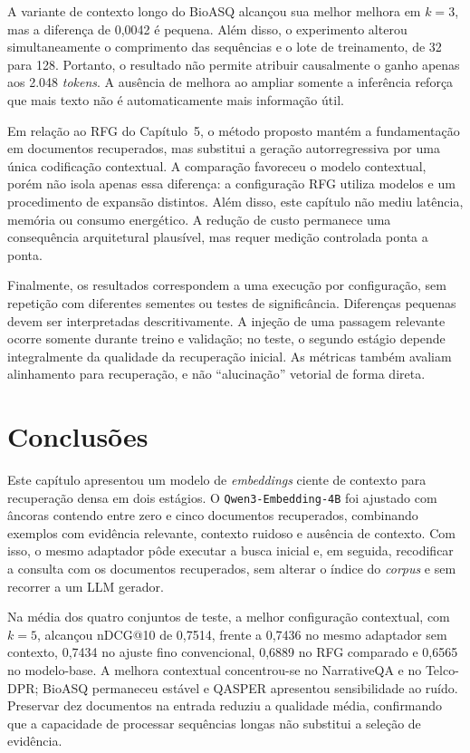 A variante de contexto longo do BioASQ alcançou sua melhor melhora em $k=3$, mas a diferença de 0,0042 é pequena. Além disso, o experimento alterou simultaneamente o comprimento das sequências e o lote de treinamento, de 32 para 128. Portanto, o resultado não permite atribuir causalmente o ganho apenas aos 2.048 \textit{tokens}. A ausência de melhora ao ampliar somente a inferência reforça que mais texto não é automaticamente mais informação útil.

Em relação ao RFG do Capítulo~5, o método proposto mantém a fundamentação em documentos recuperados, mas substitui a geração autorregressiva por uma única codificação contextual. A comparação favoreceu o modelo contextual, porém não isola apenas essa diferença: a configuração RFG utiliza modelos e um procedimento de expansão distintos. Além disso, este capítulo não mediu latência, memória ou consumo energético. A redução de custo permanece uma consequência arquitetural plausível, mas requer medição controlada ponta a ponta.

Finalmente, os resultados correspondem a uma execução por configuração, sem repetição com diferentes sementes ou testes de significância. Diferenças pequenas devem ser interpretadas descritivamente. A injeção de uma passagem relevante ocorre somente durante treino e validação; no teste, o segundo estágio depende integralmente da qualidade da recuperação inicial. As métricas também avaliam alinhamento para recuperação, e não ``alucinação'' vetorial de forma direta.

\section{Conclusões}
\label{sec:ctx-emb-conclusoes}

Este capítulo apresentou um modelo de \textit{embeddings} ciente de contexto para recuperação densa em dois estágios. O \texttt{Qwen3-Embedding-4B} foi ajustado com âncoras contendo entre zero e cinco documentos recuperados, combinando exemplos com evidência relevante, contexto ruidoso e ausência de contexto. Com isso, o mesmo adaptador pôde executar a busca inicial e, em seguida, recodificar a consulta com os documentos recuperados, sem alterar o índice do \textit{corpus} e sem recorrer a um LLM gerador.

Na média dos quatro conjuntos de teste, a melhor configuração contextual, com $k=5$, alcançou nDCG@10 de 0,7514, frente a 0,7436 no mesmo adaptador sem contexto, 0,7434 no ajuste fino convencional, 0,6889 no RFG comparado e 0,6565 no modelo-base. A melhora contextual concentrou-se no NarrativeQA e no Telco-DPR; BioASQ permaneceu estável e QASPER apresentou sensibilidade ao ruído. Preservar dez documentos na entrada reduziu a qualidade média, confirmando que a capacidade de processar sequências longas não substitui a seleção de evidência.

